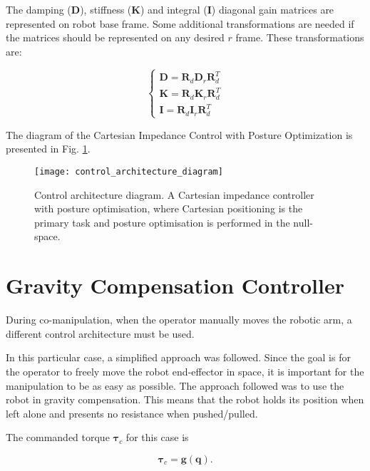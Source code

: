 The damping ($\boldsymbol{D}$), stiffness ($\boldsymbol{K}$) and integral ($\boldsymbol{I}$) diagonal gain matrices are represented on robot base frame. Some additional transformations are needed if the matrices should be represented on any desired $r$ frame. These transformations are:

\begin{equation}
    \begin{cases}
        \boldsymbol{D} = \boldsymbol{R}_d \boldsymbol{D}_r \boldsymbol{R}^T_d\\ \boldsymbol{K} = \boldsymbol{R}_d \boldsymbol{K}_r \boldsymbol{R}^T_d\\ \boldsymbol{I} = \boldsymbol{R}_d \boldsymbol{I}_r \boldsymbol{R}^T_d
    \end{cases}
\end{equation}

The diagram of the Cartesian Impedance Control with Posture Optimization is presented in Fig. \ref{fig:control_architecture_diagram}.

\begin{figure}[htbp]
	\centering
	\texttt{[image: control\_architecture\_diagram]}
	\caption{Control architecture diagram. A Cartesian impedance controller with posture optimisation, where Cartesian positioning is the primary task and posture optimisation is performed in the null-space. \cite{Ochoa2019_control_architecture_robotic_polishing}}
	\label{fig:control_architecture_diagram}
\end{figure}



\section{Gravity Compensation Controller}
\label{sec:control_architectures_gravity_compensation}

During co-manipulation, when the operator manually moves the robotic arm, a different control architecture must be used.

In this particular case, a simplified approach was followed. Since the goal is for the operator to freely move the robot end-effector in space, it is important for the manipulation to be as easy as possible. The approach followed was to use the robot in gravity compensation. This means that the robot holds its position when left alone and presents no resistance when pushed/pulled.

The commanded torque $\boldsymbol{\tau}_c$ for this case is

\begin{equation}
    \boldsymbol{\tau}_c = \boldsymbol{g}(\boldsymbol{q}).
\end{equation}

